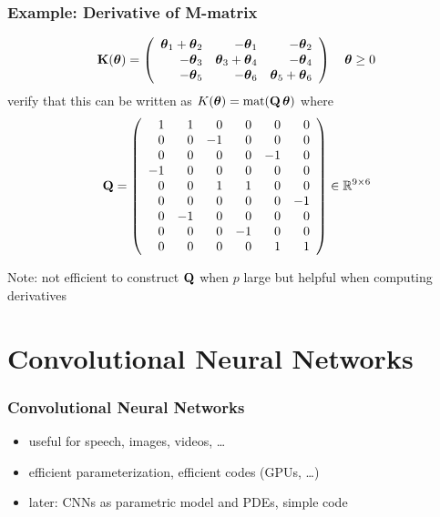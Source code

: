 \documentclass[12pt,fleqn,handout]{beamer}
\begin{document}
\begin{frame}\frametitle{Example: Derivative of M-matrix}
	$$
	{\bf K}({\boldsymbol \theta}) = \left(
			\begin{array}{rrr}
				{\boldsymbol \theta}_1+{\boldsymbol \theta}_2 & -{\boldsymbol \theta}_1 & -{\boldsymbol \theta}_2 \\
				-{\boldsymbol \theta}_3 & {\boldsymbol \theta}_3 + {\boldsymbol \theta}_4 & -{\boldsymbol \theta}_4 \\
				-{\boldsymbol \theta}_5 & -{\boldsymbol \theta}_6 & {\boldsymbol \theta}_5+{\boldsymbol \theta}_6
			\end{array}
		\right)
		\quad {\boldsymbol \theta} \geq 0
	$$
	\pause
	verify that this can be written as $K({\boldsymbol \theta}) = {\rm mat}({\bf Q} \, {\boldsymbol \theta})$ where
	$$
		{\bf Q} = \left(
			\begin{array}{rrrrrr}
				1 & 1 & 0 & 0 & 0 & 0 \\
				0 & 0 & -1& 0 & 0 & 0 \\
				0 & 0 & 0 & 0 &-1 & 0 \\
				-1& 0 & 0 & 0 & 0 & 0 \\
				0 & 0 & 1 & 1 & 0 & 0 \\
				0 & 0 & 0 & 0 & 0 &-1 \\
				0 &-1 & 0 & 0 & 0 & 0 \\
				0 & 0 & 0 & -1& 0 & 0 \\
				0 & 0 & 0 & 0 & 1 & 1
			\end{array}
		\right) \in \mathbb{R}^{9\times 6}
	$$
	\begin{center}
		Note: not efficient to construct ${\bf Q}$ when $p$ large but helpful when computing derivatives
	\end{center}
\end{frame}


\section{Convolutional Neural Networks} %
\label{sec:convolutional_neural_networks}
\begin{frame}\frametitle{Convolutional Neural Networks~\cite{LeCun1990}}
	\begin{center}
	\end{center}
	\begin{itemize}
		\item useful for speech, images, videos, \ldots
		\item efficient parameterization, efficient codes (GPUs, \ldots)
		\item later: CNNs as parametric model and PDEs, simple code
	\end{itemize}

\end{frame}
\end{document}
